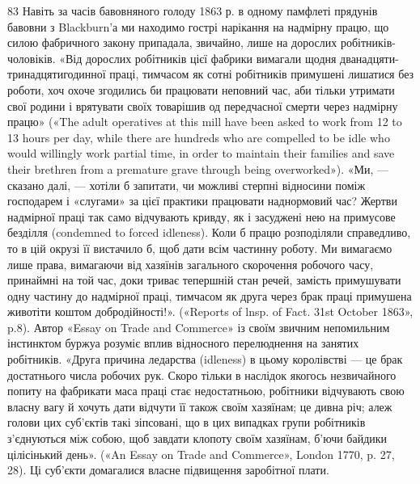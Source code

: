 83 Навіть за часів бавовняного голоду 1863 р. в одному памфлеті
прядунів бавовни з Blackburn’а ми находимо гострі нарікання на надмірну
працю, що силою фабричного закону припадала, звичайно, лише
на дорослих робітників-чоловіків. «Від дорослих робітників цієї фабрики
вимагали щодня дванадцяти-тринадцятигодинної праці, тимчасом
як сотні робітників примушені лишатися без роботи, хоч охоче згодились
би працювати неповний час, аби тільки утримати свої родини і врятувати
своїх товарішив од передчасної смерти через надмірну працю» («The
adult operatives at this mill have been asked to work from 12 to 13 hours
per day, while there are hundreds who are compelled to be idle who would
willingly work partial time, in order to maintain their families and save
their brethren from a premature grave through being overworked»). «Ми, —
сказано далі, — хотіли б запитати, чи можливі стерпні відносини поміж
господарем і «слугами» за цієї практики працювати наднормовий час?
Жертви надмірної праці так само відчувають кривду, як і засуджені
нею на примусове безділля (condemned to forced idleness). Коли б працю
розподіляли справедливо, то в цій окрузі її вистачило б, щоб дати всім
частинну роботу. Ми вимагаємо лише права, вимагаючи від хазяїнів загального
скорочення робочого часу, принаймні на той час, доки триває
тепершній стан речей, замість примушувати одну частину до надмірної
праці, тимчасом як друга через брак праці примушена животіти коштом
добродійності!». («Reports of lnsp. of Fact. 31st October 1863», p.8).
Автор «Essay on Trade and Commerce» із своїм звичним непомильним
інстинктом буржуа розуміє вплив відносного перелюднення на занятих
робітників. «Друга причина ледарства (idleness) в цьому королівстві —
це брак достатнього числа робочих рук. Скоро тільки в наслідок якогось
незвичайного попиту на фабрикати маса праці стає недостатньою, робітники
відчувають свою власну вагу й хочуть дати відчути її також своїм
хазяїнам; це дивна річ; алеж голови цих суб’єктів такі зіпсовані, що в цих
випадках групи робітників з’єднуються між собою, щоб завдати клопоту
своїм хазяїнам, б’ючи байдики цілісінький день». («An Essay on Trade
and Commerce», London 1770, p. 27, 28). Ці суб’єкти домагалися власне
підвищення заробітної плати.
